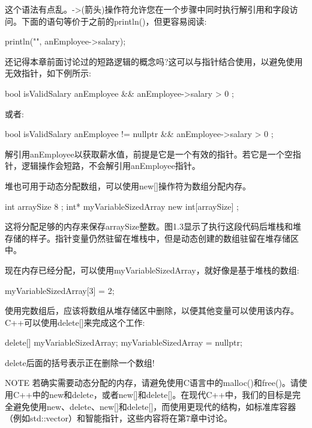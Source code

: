 这个语法有点乱。->(箭头)操作符允许您在一个步骤中同时执行解引用和字段访问。下面的语句等价于之前的println()，但更容易阅读:

\begin{cpp}
println("{}", anEmployee->salary);
\end{cpp}

还记得本章前面讨论过的短路逻辑的概念吗?这可以与指针结合使用，以避免使用无效指针，如下例所示:

\begin{cpp}
bool isValidSalary { anEmployee && anEmployee->salary > 0 };
\end{cpp}

或者:

\begin{cpp}
bool isValidSalary { anEmployee != nullptr && anEmployee->salary > 0 };
\end{cpp}

解引用anEmployee以获取薪水值，前提是它是一个有效的指针。若它是一个空指针，逻辑操作会短路，不会解引用anEmployee指针。


堆也可用于动态分配数组，可以使用new[]操作符为数组分配内存。

\begin{cpp}
int arraySize { 8 };
int* myVariableSizedArray { new int[arraySize] };
\end{cpp}

这将分配足够的内存来保存arraySize整数。图1.3显示了执行这段代码后堆栈和堆存储的样子。指针变量仍然驻留在堆栈中，但是动态创建的数组驻留在堆存储区中。


现在内存已经分配，可以使用myVariableSizedArray，就好像是基于堆栈的数组:

\begin{cpp}
myVariableSizedArray[3] = 2;
\end{cpp}

使用完数组后，应该将数组从堆存储区中删除，以便其他变量可以使用该内存。C++可以使用delete[]来完成这个工作:

\begin{cpp}
delete[] myVariableSizedArray;
myVariableSizedArray = nullptr;
\end{cpp}

delete后面的括号表示正在删除一个数组!

\begin{myNotic}{NOTE}
若确实需要动态分配的内存，请避免使用C语言中的malloc()和free()。请使用C++中的new和delete，或者new[]和delete[]。在现代C++中，我们的目标是完全避免使用new、delete、new[]和delete[]，而使用更现代的结构，如标准库容器（例如std::vector）和智能指针，这些内容将在第7章中讨论。
\end{myNotic}

